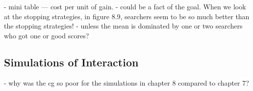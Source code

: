- mini table — cost per unit of gain.
		- could be a fact of the goal. When we look at the stopping strategies, in figure 8.9, searchers seem to be so much better than the stopping strategies!
		- unless the mean is dominated by one or two searchers who got one or good scores?

\subsection{Simulations of Interaction}

- why was the cg so poor for the simulations in chapter 8 compared to chapter 7?


%
%
%
%
